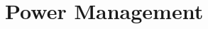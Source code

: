 \chapter{Power Management}

\pagestyle{andreweuan}



\newpage
\newpage
\newpage
\newpage
\newpage

